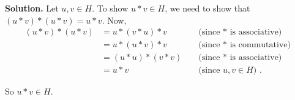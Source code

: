 \documentclass[10pt,]{book}
\theoremstyle{plain}
\theoremstyle{definition}
\theoremstyle{definition}
\theoremstyle{definition}
\theoremstyle{definition}
\numberwithin{equation}{section}
\newcommand{\amp}{&}
\begin{document}
\begin{exerciselist}
\par\smallskip
\par\smallskip
\noindent\textbf{Solution.}\hypertarget{solution-11}{}\quad
Let \(u,v\in H\). To show \(u*v\in H\), we need to show that \((u*v)*(u*v)=u*v\). Now,%
\begin{align*}
(u*v)*(u*v)\amp =u*(v*u)*v \amp \amp \text{ (since \(*\) is associative) }\\
\amp =u*(u*v)*v \amp \amp \text{ (since \(*\) is commutative) }\\
\amp =(u*u)*(v*v) \amp \amp \text{ (since \(*\) is associative) }\\
\amp =u*v \amp \amp \text{ (since \(u,v\in H\)) } .
\end{align*}
%
\par
So \(u*v\in H\).%
\end{exerciselist}
\typeout{************************************************}
\typeout{************************************************}
\end{document}
